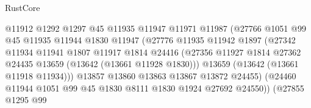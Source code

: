 \begin{lexlean}{RustCore}
\begin{coremodule}
                                    @11912
                                    @1292
                                    @1297
                                    @45
                                    @11935
                                    @11947
                                    @11971
                                    @11987
                                    (@27766
                                      @1051
                                      @99
                                      @45
                                      @11935
                                      @11944
                                      @1830
                                      @11947
                                      (@27776
                                        @11935
                                        @11942
                                        @1897
                                        (@27342
                                          @11934
                                          @11941
                                          @1807
                                          @11917
                                          @1814
                                          @24416
                                          (@27356
                                            @11927
                                            @1814
                                            @27362
                                            @24435
                                            @13659
                                            (@13642 (@13661 @11928 @1830)))
                                          @13659
                                          (@13642 (@13661 @11918 @11934)))
                                        @13857
                                        @13860
                                        @13863
                                        @13867
                                        @13872
                                        @24455)
                                      (@24460
                                        @11944
                                        @1051
                                        @99
                                        @45
                                        @1830
                                        @8111
                                        @1830
                                        @1924
                                        @27692
                                        @24550))
                                    (@27855
                                      @1295
                                      @99

\end{coremodule}
\end{lexlean}
